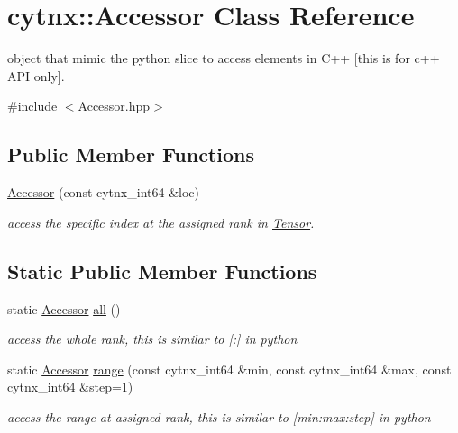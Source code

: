 \hypertarget{classcytnx_1_1Accessor}{}\section{cytnx\+:\+:Accessor Class Reference}
\label{classcytnx_1_1Accessor}


object that mimic the python slice to access elements in C++ \mbox{[}this is for c++ A\+PI only\mbox{]}.  




{\ttfamily \#include $<$Accessor.\+hpp$>$}

\subsection*{Public Member Functions}
\begin{DoxyCompactItemize}
\item 
\hyperlink{classcytnx_1_1Accessor_a9f6fa9087f09756e020355a05196d384}{Accessor} (const cytnx\+\_\+int64 \&loc)
\begin{DoxyCompactList}\small\item\em access the specific index at the assigned rank in \hyperlink{classcytnx_1_1Tensor}{Tensor}. \end{DoxyCompactList}\end{DoxyCompactItemize}
\subsection*{Static Public Member Functions}
\begin{DoxyCompactItemize}
\item 
static \hyperlink{classcytnx_1_1Accessor}{Accessor} \hyperlink{classcytnx_1_1Accessor_a71b8c4af7182a2c9144929bdef9ff4fd}{all} ()
\begin{DoxyCompactList}\small\item\em access the whole rank, this is similar to \mbox{[}\+:\mbox{]} in python \end{DoxyCompactList}\item 
static \hyperlink{classcytnx_1_1Accessor}{Accessor} \hyperlink{classcytnx_1_1Accessor_a7a5a508a58b71897c3dd162195aceaa9}{range} (const cytnx\+\_\+int64 \&min, const cytnx\+\_\+int64 \&max, const cytnx\+\_\+int64 \&step=1)
\begin{DoxyCompactList}\small\item\em access the range at assigned rank, this is similar to \mbox{[}min\+:max\+:step\mbox{]} in python \end{DoxyCompactList}\end{DoxyCompactItemize}


